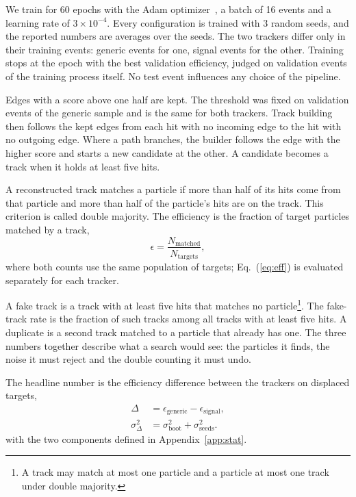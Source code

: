 We train for 60 epochs with the Adam optimizer~\cite{Bauer2016Adam}, a batch of 16 events and a learning rate of $3\times10^{-4}$. Every configuration is trained with 3 random seeds, and the reported numbers are averages over the seeds. The two trackers differ only in their training events: generic events for one, signal events for the other. Training stops at the epoch with the best validation efficiency, judged on validation events of the training process itself. No test event influences any choice of the pipeline.

Edges with a score above one half are kept. The threshold was fixed on validation events of the generic sample and is the same for both trackers. Track building then follows the kept edges from each hit with no incoming edge to the hit with no outgoing edge. Where a path branches, the builder follows the edge with the higher score and starts a new candidate at the other. A candidate becomes a track when it holds at least five hits.

A reconstructed track matches a particle if more than half of its hits come from that particle and more than half of the particle's hits are on the track. This criterion is called double majority. The efficiency is the fraction of target particles matched by a track,
\begin{equation}
  \epsilon = \frac{N_{\text{matched}}}{N_{\text{targets}}} ,
  \label{eq:eff}
\end{equation}
where both counts use the same population of targets; Eq.~(\ref{eq:eff}) is evaluated separately for each tracker.

A fake track is a track with at least five hits that matches no particle\footnote{A track may match at most one particle and a particle at most one track under double majority.}. The fake-track rate is the fraction of such tracks among all tracks with at least five hits. A duplicate is a second track matched to a particle that already has one. The three numbers together describe what a search would see: the particles it finds, the noise it must reject and the double counting it must undo.

The headline number is the efficiency difference between the trackers on displaced targets,
\begin{align}
  \Delta &= \epsilon_{\text{generic}} - \epsilon_{\text{signal}} , \label{eq:delta} \\
  \sigma_\Delta^2 &= \sigma_{\text{boot}}^2 + \sigma_{\text{seeds}}^2 . \label{eq:sigma}
\end{align}
with the two components defined in Appendix~\ref{app:stat}.

